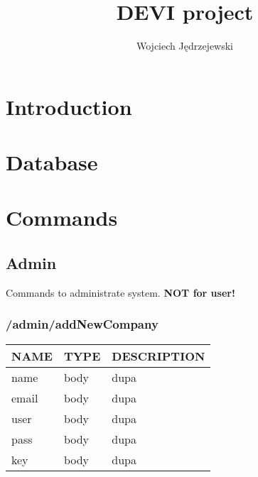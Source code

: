 \documentclass[a4paper, 12pt]{report}
\begin{document}
\title{\Large{\textbf{DEVI project}}}
\author{Wojciech Jędrzejewski}

\maketitle

\chapter{Introduction}

\chapter{Database}

\chapter{Commands}
\section{Admin}
Commands to administrate system. \textbf{NOT for user!}

\subsection{/admin/addNewCompany}

\begin{table}[!ht]
    \raggedright
    \begin{tabular}{|l|l|l|}
    \hline
        \textbf{NAME} & \textbf{TYPE} & \textbf{DESCRIPTION} \\ \hline
        name & body & dupa \\ \hline
        email & body & dupa \\ \hline
        user & body & dupa \\ \hline
        pass & body & dupa \\ \hline
        key & body & dupa \\ \hline
    \end{tabular}
\end{table}
\end{document}
